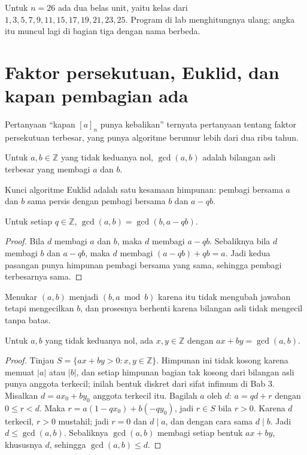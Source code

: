 Untuk $n=26$ ada dua belas unit, yaitu kelas dari $1,3,5,7,9,11,15,17,19,21,23,25$. Program di
lab menghitungnya ulang; angka itu muncul lagi di bagian tiga dengan nama berbeda.

\section{Faktor persekutuan, Euklid, dan kapan pembagian ada}

Pertanyaan ``kapan $[a]_n$ punya kebalikan'' ternyata pertanyaan tentang faktor persekutuan
terbesar, yang punya algoritme berumur lebih dari dua ribu tahun.

\begin{definisi}
Untuk $a,b\in\mathbb{Z}$ yang tidak keduanya nol, $\gcd(a,b)$ adalah bilangan asli terbesar
yang membagi $a$ dan $b$.
\end{definisi}

Kunci algoritme Euklid adalah satu kesamaan himpunan: pembagi bersama $a$ dan $b$ sama persis
dengan pembagi bersama $b$ dan $a-qb$.

\begin{lemma}
Untuk setiap $q\in\mathbb{Z}$, $\gcd(a,b)=\gcd(b,a-qb)$.
\end{lemma}

\begin{proof}
Bila $d$ membagi $a$ dan $b$, maka $d$ membagi $a-qb$. Sebaliknya bila $d$ membagi $b$ dan
$a-qb$, maka $d$ membagi $(a-qb)+qb=a$. Jadi kedua pasangan punya himpunan pembagi bersama
yang sama, sehingga pembagi terbesarnya sama.
\end{proof}

Menukar $(a,b)$ menjadi $(b,a\bmod b)$ karena itu tidak mengubah jawaban tetapi mengecilkan
$b$, dan prosesnya berhenti karena bilangan asli tidak mengecil tanpa batas.

\begin{teorema}[Bezout]
Untuk $a,b$ yang tidak keduanya nol, ada $x,y\in\mathbb{Z}$ dengan $ax+by=\gcd(a,b)$.
\end{teorema}

\begin{proof}
Tinjau $S=\{ax+by>0: x,y\in\mathbb{Z}\}$. Himpunan ini tidak kosong karena memuat $|a|$ atau
$|b|$, dan setiap himpunan bagian tak kosong dari bilangan asli punya anggota terkecil; inilah
bentuk diskret dari sifat infimum di Bab 3. Misalkan $d=ax_0+by_0$ anggota terkecil itu.
Bagilah $a$ oleh $d$: $a=qd+r$ dengan $0\le r<d$. Maka $r=a(1-qx_0)+b(-qy_0)$, jadi $r\in S$
bila $r>0$. Karena $d$ terkecil, $r>0$ mustahil; jadi $r=0$ dan $d\mid a$, dan dengan cara
sama $d\mid b$. Jadi $d\le\gcd(a,b)$. Sebaliknya $\gcd(a,b)$ membagi setiap bentuk $ax+by$,
khususnya $d$, sehingga $\gcd(a,b)\le d$.
\end{proof}

